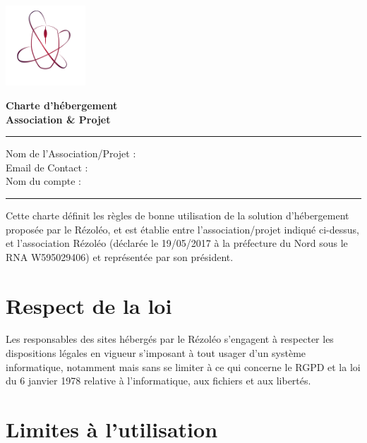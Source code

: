 \documentclass[12pt, a4paper]{article}
\begin{document}
\begin{center}
	\begin{minipage}{0.2\textwidth}
		\includegraphics[height=3cm]{rezoleo_logo.png}
	\end{minipage}
	\begin{minipage}{0.7\textwidth}
		\vspace{0.3cm}
		\Huge \textbf{Charte d'hébergement}\\
		\Huge \textbf{Association \& Projet}
	\end{minipage}
\end{center}

\vspace*{0.5cm}

\hrule
\vspace{.5cm}
\noindent Nom de l'Association/Projet : \dotfill
\vspace{.5cm}\\
Email de Contact : \dotfill
\vspace{.5cm}\\
Nom du compte : \dotfill\\
\hrule
\vspace{1cm}

\noindent Cette charte définit les règles de bonne utilisation de la solution d'hébergement proposée par le Rézoléo, et est établie entre l'association/projet indiqué ci-dessus, et l'association Rézoléo (déclarée le 19/05/2017 à la préfecture du Nord sous le RNA W595029406) et représentée par son président.

\section{Respect de la loi}

Les responsables des sites hébergés par le Rézoléo s'engagent à respecter les dispositions légales en vigueur s'imposant à tout usager d'un système informatique, notamment mais sans se limiter à ce qui concerne le RGPD et la loi du 6 janvier 1978 relative à l'informatique, aux fichiers et aux libertés.

\section{Limites à l'utilisation}
\end{document}
